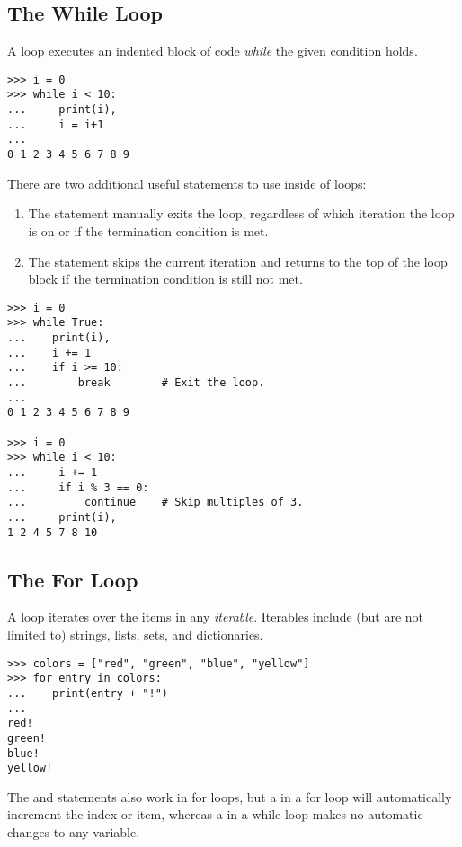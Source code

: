 \subsection*{The While Loop} %

A  loop executes an indented block of code \emph{while} the given condition holds. 

\begin{lstlisting}
>>> i = 0
>>> while i < 10:        
...     print(i),            
...     i = i+1
...     
0 1 2 3 4 5 6 7 8 9
\end{lstlisting}

There are two additional useful statements to use inside of loops:
\begin{enumerate}
\item The  statement manually exits the loop, regardless of which iteration the loop is on or if the termination condition is met.
\item The  statement skips the current iteration and returns to the top of the loop block if the termination condition is still not met.
\end{enumerate}

\begin{lstlisting}
>>> i = 0
>>> while True:
...    print(i),
...    i += 1
...    if i >= 10:
...        break        # Exit the loop.
...
0 1 2 3 4 5 6 7 8 9

>>> i = 0
>>> while i < 10:
...     i += 1
...     if i % 3 == 0:
...         continue    # Skip multiples of 3.
...     print(i),
1 2 4 5 7 8 10
\end{lstlisting}

\subsection*{The For Loop} %

A  loop iterates over the items in any \emph{iterable}.
Iterables include (but are not limited to) strings, lists, sets, and dictionaries.

\begin{lstlisting}
>>> colors = ["red", "green", "blue", "yellow"]
>>> for entry in colors:
...    print(entry + "!")
...
red!
green!
blue!
yellow!
\end{lstlisting}

The  and  statements also work in for loops, but a  in a for loop will automatically increment the index or item, whereas a  in a while loop makes no automatic changes to any variable.

